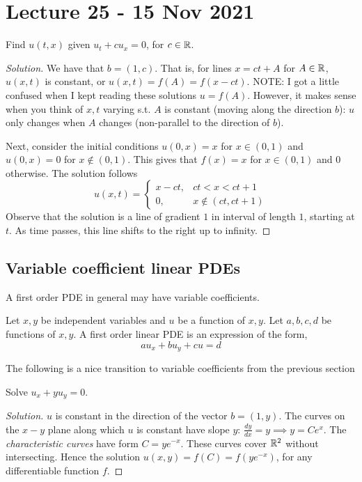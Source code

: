 \section{Lecture 25 - 15 Nov 2021}
\begin{example}
  Find $u(t,x)$ given $u_t+cu_x=0$, for $c\in\mathbb R$.
\end{example}
\begin{proof}[Solution]
  We have that $b=(1,c)$. That is, for lines $x=ct+A$ for $A\in\mathbb R$, $u(x,t)$ is constant,
  or $u(x,t)=f(A)=f(x-ct)$.
  NOTE: I got a little confused when I kept reading these solutions $u=f(A)$. However, it
  makes sense when you think of $x,t$ varying s.t. $A$ is constant (moving along the
  direction $b$): $u$ only changes when $A$ changes (non-parallel to the direction of
  $b$).

  Next, consider the initial conditions $u(0,x)=x$ for $x\in(0,1)$ and $u(0,x)=0$ for
  $x\not\in(0,1)$. This gives that $f(x)=x$ for $x\in(0,1)$ and $0$ otherwise. The
  solution follows
  \[u(x,t)=
    \begin{cases}
      x-ct, & ct<x<ct+1\\
      0, & x\not\in(ct,ct+1)
    \end{cases}
  \]
  Observe that the solution is a line of gradient $1$ in interval of length $1$, starting
  at $t$. As time passes, this line shifts to the right up to infinity.
\end{proof}
\subsection{Variable coefficient linear PDEs}
A first order PDE in general may have variable coefficients.
\begin{definition}
  Let $x,y$ be independent variables and $u$ be a function of $x,y$. Let $a,b,c,d$ be
  functions of $x,y$. A first order linear PDE is an expression of the form,
  \[au_x+bu_y+cu=d\]
  \label{def:firstOrdPDE}
\end{definition}
The following is a nice transition to variable coefficients from the previous section
\begin{example}
  Solve $u_x+yu_y =0$.
\end{example}
\begin{proof}[Solution]
  $u$ is constant in the direction of the vector $b=(1,y)$. The curves on the $x-y$ plane
  along which $u$ is constant have slope $y$: $\frac{dy}{dx}=y\implies y=Ce^x$. The
  \emph{characteristic curves} have form $C=ye^{-x}$. These curves cover $\mathbb R^2$ without
  intersecting. Hence the solution $u(x,y)=f(C)=f(ye^{-x})$, for any differentiable
  function $f$.
\end{proof}
